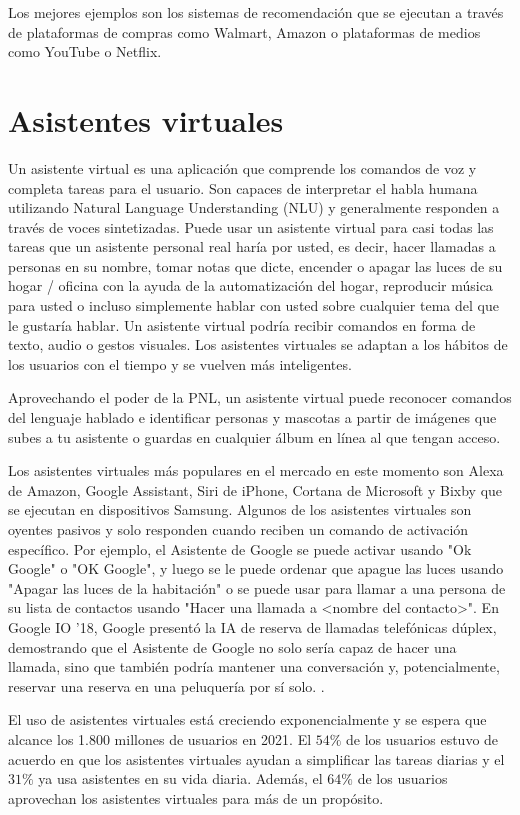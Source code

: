 Los mejores ejemplos son los sistemas de recomendación que se ejecutan a través de plataformas de compras como Walmart, Amazon o plataformas de medios como YouTube o Netflix.

\section{Asistentes virtuales}

Un asistente virtual es una aplicación que comprende los comandos de voz y completa tareas para el usuario. Son capaces de interpretar el habla humana utilizando Natural Language Understanding (NLU) y generalmente responden a través de voces sintetizadas. Puede usar un asistente virtual para casi todas las tareas que un asistente personal real haría por usted, es decir, hacer llamadas a personas en su nombre, tomar notas que dicte, encender o apagar las luces de su hogar / oficina con la ayuda de la automatización del hogar, reproducir música para usted o incluso simplemente hablar con usted sobre cualquier tema del que le gustaría hablar. Un asistente virtual podría recibir comandos en forma de texto, audio o gestos visuales. Los asistentes virtuales se adaptan a los hábitos de los usuarios con el tiempo y se vuelven más inteligentes.

Aprovechando el poder de la PNL, un asistente virtual puede reconocer comandos del lenguaje hablado e identificar personas y mascotas a partir de imágenes que subes a tu asistente o guardas en cualquier álbum en línea al que tengan acceso.

Los asistentes virtuales más populares en el mercado en este momento son Alexa de Amazon, Google Assistant, Siri de iPhone, Cortana de Microsoft y Bixby que se ejecutan en dispositivos Samsung. Algunos de los asistentes virtuales son oyentes pasivos y solo responden cuando reciben un comando de activación específico. Por ejemplo, el Asistente de Google se puede activar usando "Ok Google" o "OK Google", y luego se le puede ordenar que apague las luces usando "Apagar las luces de la habitación" o se puede usar para llamar a una persona de su lista de contactos usando "Hacer una llamada a <nombre del contacto>". En Google IO '18, Google presentó la IA de reserva de llamadas telefónicas dúplex, demostrando que el Asistente de Google no solo sería capaz de hacer una llamada, sino que también podría mantener una conversación y, potencialmente, reservar una reserva en una peluquería por sí solo. .

El uso de asistentes virtuales está creciendo exponencialmente y se espera que alcance los 1.800 millones de usuarios en 2021. El $54\%$ de los usuarios estuvo de acuerdo en que los asistentes virtuales ayudan a simplificar las tareas diarias y el $31\%$ ya usa asistentes en su vida diaria. Además, el $64\%$ de los usuarios aprovechan los asistentes virtuales para más de un propósito.


